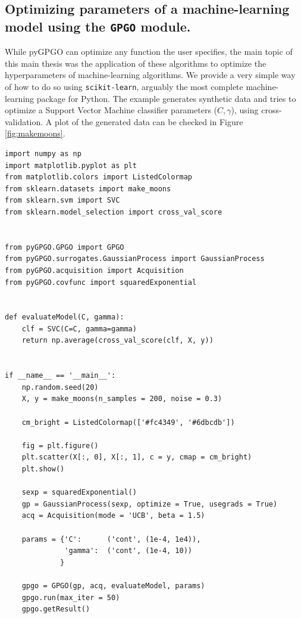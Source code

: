 \documentclass[10pt,a4paper,twoside]{book}
\begin{document}
\subsection{Optimizing parameters of a machine-learning model using the \texttt{GPGO} module.}

While pyGPGO can optimize any function the user specifies, the main topic of this main thesis was the application of these algorithms to optimize the hyperparameters of machine-learning algorithms. We provide a very simple way of how to do so using \texttt{scikit-learn}, arguably the most complete machine-learning package for Python. The example generates synthetic data and tries to optimize a Support Vector Machine classifier parameters ($C, \gamma$), using cross-validation. A plot of the generated data can be checked in Figure \ref{fig:makemoons}.\\

\begin{verbatim}
import numpy as np
import matplotlib.pyplot as plt
from matplotlib.colors import ListedColormap
from sklearn.datasets import make_moons
from sklearn.svm import SVC
from sklearn.model_selection import cross_val_score


from pyGPGO.GPGO import GPGO
from pyGPGO.surrogates.GaussianProcess import GaussianProcess
from pyGPGO.acquisition import Acquisition
from pyGPGO.covfunc import squaredExponential


def evaluateModel(C, gamma):
    clf = SVC(C=C, gamma=gamma)
    return np.average(cross_val_score(clf, X, y))
    

if __name__ == '__main__':
    np.random.seed(20)
    X, y = make_moons(n_samples = 200, noise = 0.3)

    cm_bright = ListedColormap(['#fc4349', '#6dbcdb'])
    
    fig = plt.figure()
    plt.scatter(X[:, 0], X[:, 1], c = y, cmap = cm_bright)
    plt.show()
    
    sexp = squaredExponential()
    gp = GaussianProcess(sexp, optimize = True, usegrads = True)
    acq = Acquisition(mode = 'UCB', beta = 1.5)

    params = {'C':      ('cont', (1e-4, 1e4)),
              'gamma':  ('cont', (1e-4, 10))
             }

    gpgo = GPGO(gp, acq, evaluateModel, params)
    gpgo.run(max_iter = 50)
    gpgo.getResult()               
\end{verbatim}
\end{document}
